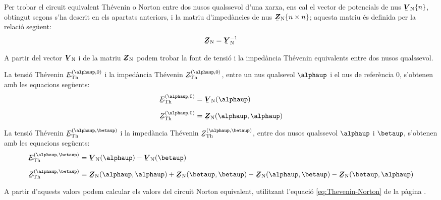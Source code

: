 Per trobar el
circuit equivalent Thévenin o Norton entre dos nusos qualssevol
d'una xarxa, ens cal el vector de potencials de nus
$\mcmplx{V}\ped{N}\{n\}$, obtingut segons s'ha descrit en els
apartats anteriors, i la matriu d'impedàncies de nus
$\mcmplx{Z}\ped{N}\{n\times n\}$; aquesta matriu és definida per
la relació següent:
\begin{equation}
   \mcmplx{Z}\ped{N} = \mcmplx{Y}\ped{N}^{-1}
\end{equation}

A partir del vector $\mcmplx{V}\ped{N}$ i de la matriu
$\mcmplx{Z}\ped{N}$ podem trobar la font de tensió i la impedància
Thévenin equivalents entre dos nusos qualssevol.

La tensió Thévenin $\cmplx{E}\ped{Th}^{(\alphaup,0)}$ i la impedància
Thévenin $\cmplx{Z}\ped{Th}^{(\alphaup,0)}$, entre  un nus qualsevol
$\alphaup$ i el nus de referència 0, s'obtenen amb les equacions
següents:
\begin{align}
    \cmplx{E}\ped{Th}^{(\alphaup,0)} &= \mcmplx{V}\ped{N}(\alphaup) \\[2mm]
    \cmplx{Z}\ped{Th}^{(\alphaup,0)} &= \mcmplx{Z}\ped{N}(\alphaup,\alphaup)
\end{align}

La tensió Thévenin $\cmplx{E}\ped{Th}^{(\alphaup,\betaup)}$ i la
impedància Thévenin $\cmplx{Z}\ped{Th}^{(\alphaup,\betaup)}$, entre dos
nusos qualssevol $\alphaup$ i $\betaup$, s'obtenen amb les equacions
següents:
\begin{align}
    \cmplx{E}\ped{Th}^{(\alphaup,\betaup)} &= \mcmplx{V}\ped{N}(\alphaup) - \mcmplx{V}\ped{N}(\betaup) \\[2mm]
    \cmplx{Z}\ped{Th}^{(\alphaup,\betaup)} &= \mcmplx{Z}\ped{N}(\alphaup,\alphaup) +
    \mcmplx{Z}\ped{N}(\betaup,\betaup) - \mcmplx{Z}\ped{N}(\alphaup,\betaup) -
    \mcmplx{Z}\ped{N}(\betaup,\alphaup)
\end{align}

A partir d'aquests valors podem calcular els valors del circuit Norton equivalent, utilitzant l'equació \eqref{eq:Thevenin-Norton} de la pàgina \pageref{eq:Thevenin-Norton}.


